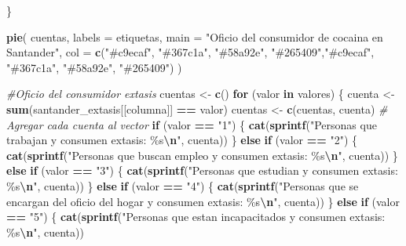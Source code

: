 \documentclass[
]{article}
\newenvironment{Shaded}{\begin{snugshade}}{\end{snugshade}}
\newcommand{\AttributeTok}[1]{\textcolor[rgb]{0.13,0.29,0.53}{#1}}
\newcommand{\CommentTok}[1]{\textcolor[rgb]{0.56,0.35,0.01}{\textit{#1}}}
\newcommand{\ControlFlowTok}[1]{\textcolor[rgb]{0.13,0.29,0.53}{\textbf{#1}}}
\newcommand{\FunctionTok}[1]{\textcolor[rgb]{0.13,0.29,0.53}{\textbf{#1}}}
\newcommand{\NormalTok}[1]{#1}
\newcommand{\OtherTok}[1]{\textcolor[rgb]{0.56,0.35,0.01}{#1}}
\newcommand{\SpecialCharTok}[1]{\textcolor[rgb]{0.81,0.36,0.00}{\textbf{#1}}}
\newcommand{\StringTok}[1]{\textcolor[rgb]{0.31,0.60,0.02}{#1}}
\begin{document}
\begin{Shaded}
\begin{Highlighting}[]
\NormalTok{\}}

\FunctionTok{pie}\NormalTok{(}
\NormalTok{  cuentas,}
  \AttributeTok{labels =}\NormalTok{ etiquetas,}
  \AttributeTok{main =} \StringTok{"Oficio del consumidor de cocaina en Santander"}\NormalTok{,}
  \AttributeTok{col =} \FunctionTok{c}\NormalTok{(}\StringTok{"\#c9ecaf"}\NormalTok{, }\StringTok{"\#367c1a"}\NormalTok{, }\StringTok{"\#58a92e"}\NormalTok{, }\StringTok{"\#265409"}\NormalTok{,}\StringTok{"\#c9ecaf"}\NormalTok{, }\StringTok{"\#367c1a"}\NormalTok{, }\StringTok{"\#58a92e"}\NormalTok{, }\StringTok{"\#265409"}\NormalTok{)}
\NormalTok{)}


\CommentTok{\#Oficio del consumidor extasis }
\NormalTok{cuentas }\OtherTok{\textless{}{-}} \FunctionTok{c}\NormalTok{()}
\ControlFlowTok{for}\NormalTok{ (valor }\ControlFlowTok{in}\NormalTok{ valores) \{}
\NormalTok{  cuenta }\OtherTok{\textless{}{-}} \FunctionTok{sum}\NormalTok{(santander\_extasis[[columna]] }\SpecialCharTok{==}\NormalTok{ valor)}
\NormalTok{  cuentas }\OtherTok{\textless{}{-}} \FunctionTok{c}\NormalTok{(cuentas, cuenta)  }\CommentTok{\# Agregar cada cuenta al vector}
  \ControlFlowTok{if}\NormalTok{ (valor }\SpecialCharTok{==} \StringTok{"1"}\NormalTok{) \{}
    \FunctionTok{cat}\NormalTok{(}\FunctionTok{sprintf}\NormalTok{(}\StringTok{"Personas que trabajan y consumen extasis: \%s}\SpecialCharTok{\textbackslash{}n}\StringTok{"}\NormalTok{, cuenta))}
\NormalTok{  \} }\ControlFlowTok{else} \ControlFlowTok{if}\NormalTok{ (valor }\SpecialCharTok{==} \StringTok{"2"}\NormalTok{) \{}
    \FunctionTok{cat}\NormalTok{(}\FunctionTok{sprintf}\NormalTok{(}\StringTok{"Personas que buscan empleo y consumen extasis: \%s}\SpecialCharTok{\textbackslash{}n}\StringTok{"}\NormalTok{, cuenta))}
\NormalTok{  \} }\ControlFlowTok{else} \ControlFlowTok{if}\NormalTok{ (valor }\SpecialCharTok{==} \StringTok{"3"}\NormalTok{) \{}
    \FunctionTok{cat}\NormalTok{(}\FunctionTok{sprintf}\NormalTok{(}\StringTok{"Personas que estudian y consumen extasis: \%s}\SpecialCharTok{\textbackslash{}n}\StringTok{"}\NormalTok{, cuenta))}
\NormalTok{  \} }\ControlFlowTok{else} \ControlFlowTok{if}\NormalTok{ (valor }\SpecialCharTok{==} \StringTok{"4"}\NormalTok{) \{}
    \FunctionTok{cat}\NormalTok{(}\FunctionTok{sprintf}\NormalTok{(}\StringTok{"Personas que se encargan del oficio del hogar y consumen extasis: \%s}\SpecialCharTok{\textbackslash{}n}\StringTok{"}\NormalTok{, cuenta))}
\NormalTok{  \} }\ControlFlowTok{else} \ControlFlowTok{if}\NormalTok{ (valor }\SpecialCharTok{==} \StringTok{"5"}\NormalTok{) \{}
    \FunctionTok{cat}\NormalTok{(}\FunctionTok{sprintf}\NormalTok{(}\StringTok{"Personas que estan incapacitados y consumen extasis: \%s}\SpecialCharTok{\textbackslash{}n}\StringTok{"}\NormalTok{, cuenta))}

\end{Highlighting}
\end{Shaded}
\end{document}
